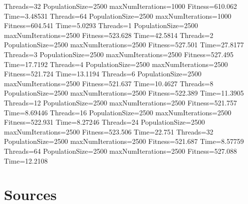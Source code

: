 \documentclass[10pt,letterpaper]{article}
\begin{document}
Threads=32 PopulationSize=2500 maxNumIterations=1000 Fitness=610.062 Time=3.48531
Threads=64 PopulationSize=2500 maxNumIterations=1000 Fitness=604.541 Time=5.0293
Threads=1 PopulationSize=2500 maxNumIterations=2500 Fitness=523.628 Time=42.5814
Threads=2 PopulationSize=2500 maxNumIterations=2500 Fitness=527.501 Time=27.8177
Threads=3 PopulationSize=2500 maxNumIterations=2500 Fitness=527.495 Time=17.7192
Threads=4 PopulationSize=2500 maxNumIterations=2500 Fitness=521.724 Time=13.1194
Threads=6 PopulationSize=2500 maxNumIterations=2500 Fitness=521.637 Time=10.4627
Threads=8 PopulationSize=2500 maxNumIterations=2500 Fitness=522.389 Time=11.3905
Threads=12 PopulationSize=2500 maxNumIterations=2500 Fitness=521.757 Time=8.69446
Threads=16 PopulationSize=2500 maxNumIterations=2500 Fitness=522.931 Time=8.27246
Threads=24 PopulationSize=2500 maxNumIterations=2500 Fitness=523.506 Time=22.751
Threads=32 PopulationSize=2500 maxNumIterations=2500 Fitness=521.687 Time=8.57759
Threads=64 PopulationSize=2500 maxNumIterations=2500 Fitness=527.088 Time=12.2108





\section{Sources}
\end{document}
